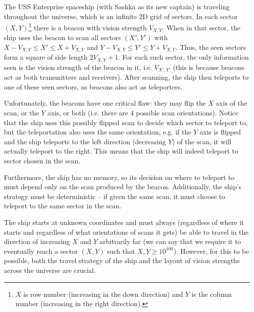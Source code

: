 \documentclass[12pt]{article}
\begin{document}
\renewcommand{\headerLang}{English}
\renewcommand{\problemName}{AB13. VISION}

\renewcommand{\headerLeft}{IATI Day 1, Senior group}
\renewcommand{\headerRightFirst}{XVII INTERNATIONAL ADVANCED TOURNAMENT IN INFORMATICS}
\renewcommand{\headerRightSecond}{ONLINE 2026}

\renewcommand{\tl}{$5$ s}
\renewcommand{\ml}{$1024$ MB}
\problem{Task \problemName}

The USS Enterprise spaceship (with Sashka as its new captain) is traveling throughout the universe, which is an infinite 2D grid of sectors. In each sector $(X, Y)$\footnote{$X$ is row number (increasing in the down direction) and $Y$ is the column number (increasing in the right direction).} there is a beacon with vision strength $V_{X, Y}$. When in that sector, the ship uses the beacon to scan all sectors $(X', Y')$ with $X - V_{X, Y} \leq X' \leq X + V_{X, Y}$ and  $Y - V_{X, Y} \leq Y' \leq Y + V_{X, Y}$. Thus, the seen sectors form a square of side length $2V_{X, Y} + 1$. For each such sector, the only information seen is the vision strength of the beacon in it, i.e. $V_{X', Y'}$ (this is because beacons act as both transmitters and receivers). After scanning, the ship then teleports to one of these seen sectors, as beacons also act as teleporters.

Unfortunately, the beacons have one critical flaw: they may flip the $X$ axis of the scan, or the $Y$ axis, or both (i.e. there are $4$ possible scan orientations). Notice that the ship uses this possibly flipped scan to decide which sector to teleport to, but the teleportation also uses the same orientation, e.g. if the $Y$ axis is flipped and the ship teleports to the left direction (decreasing $Y$) of the scan, it will actually teleport to the right. This means that the ship will indeed teleport to sector chosen in the scan.

Furthermore, the ship has no memory, so its decision on where to teleport to must depend only on the scan produced by the beacon. Additionally, the ship's strategy must be deterministic -- if given the same scan, it must choose to teleport to the same sector in the scan.

The ship starts at unknown coordinates and must always (regardless of where it starts and regardless of what orientations of scans it gets) be able to travel in the direction of increasing $X$ and $Y$ arbitrarily far (we can say that we require it to eventually reach a sector $(X, Y)$ such that $X, Y \geq 10^{100}$). However, for this to be possible, both the travel strategy of the ship and the layout of vision strengths across the universe are crucial.
\end{document}

